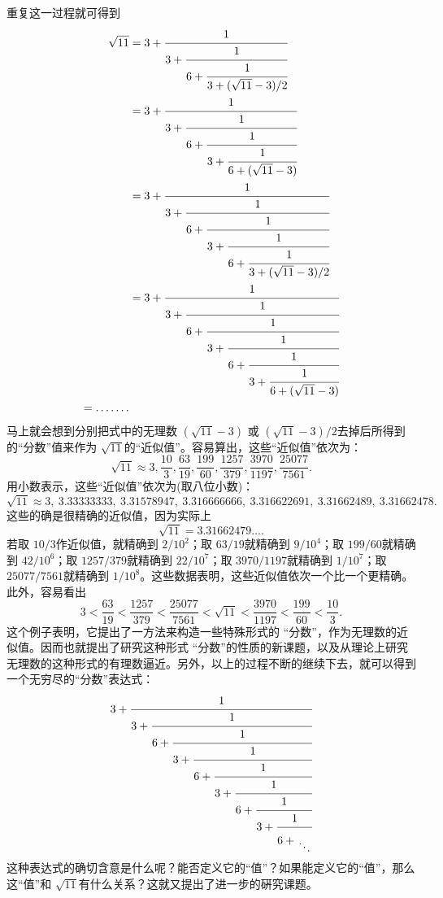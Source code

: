 \begin{example}
	重复这一过程就可得到
	\begin{align}
		\sqrt{11} & =
		3 + \cfrac{1}{3 +
			\cfrac{1}{6 +
				\cfrac{1}{3 +
					(\sqrt{11} -3)/2
		}}}          \label{cf5}  \\
		          & =
		3 + \cfrac{1}{3 +
			\cfrac{1}{6 +
				\cfrac{1}{3 +
					\cfrac{1}{6 +
						(\sqrt{11} -3)
		}}}}          \label{cf6} \\
		          & =
		3 + \cfrac{1}{3 +
			\cfrac{1}{6 +
				\cfrac{1}{3 +
					\cfrac{1}{6 +
						\cfrac{1}{3 +
							(\sqrt{11} -3) / 2
		}}}}}        \label{cf7}  \\
		          & =
		3 + \cfrac{1}{3 +
			\cfrac{1}{6 +
				\cfrac{1}{3 +
					\cfrac{1}{6 +
						\cfrac{1}{3 +
							\cfrac{1}{6 +
								(\sqrt{11} -3)
		}}}}}}        \label{cf8} \\
		= \dots\dots. \nonumber
	\end{align}
	马上就会想到分别把式中的无理数 \( (\sqrt{11} - 3) \) 或 \( (\sqrt{11} - 3)/2
	\)去掉后所得到的\enquote{分数}值来作为 \( \sqrt{11} \)的\enquote{近似值}。容易算出，这些\enquote{近似值}依次为：
	\begin{equation}\label{eq:根号11}
		\sqrt{11} \approx 3, \frac{10}{3}, \frac{63}{19}, \frac{199}{60}, \frac{1257}{379}, \frac{3970}{1197},
		\frac{25077}{7561}.
	\end{equation}
	用小数表示，这些\enquote{近似值}依次为(取八位小数)：
	\begin{equation}
		\sqrt{11} \approx 3,\: 3.33333333,\:3.31578947,\:3.316666666,\: 3.316622691,\: 3.31662489,\: 3.31662478.
	\end{equation}
	这些的确是很精确的近似值，因为实际上
	\begin{equation}
		\sqrt{11} = 3.31662479\dots.
	\end{equation}
	若取 \( 10 / 3 \)作近似值，就精确到 \( 2 / 10^2 \)；取 \( 63 / 19 \)就精确到 \( 9 / 10^4 \)；取 \( 199 / 60 \)就精确到
	\( 42 / 10^6 \)；取 \( 1257 / 379 \)就精确到 \( 22 / 10^7 \)；取 \( 3970 / 1197 \)就精确到 \( 1 / 10^7 \)；取 \( 25077 /
	7561\)就精确到 \( 1/10^8 \)。这些数据表明，这些近似值依次一个比一个更精确。此外，容易看出
	\begin{equation}
		3 < \frac{63}{19} < \frac{1257}{379} < \frac{25077}{7561} < \sqrt{11} < \frac{3970}{1197} < \frac{199}{60} <
		\frac{10}{3}.
	\end{equation}
	这个例子表明，它提出了一方法来构造一些特殊形式的 \enquote{分数}，作为无理数的近似值。因而也就提出了研究这种形式
	\enquote{分数}的性质的新课题，以及从理论上研究无理数的这种形式的有理数逼近。另外，以上的过程不断的继续下去，就可以得到
	一个无穷尽的\enquote{分数}表达式：
	\begin{equation}
		3 + \cfrac{1}{3 +
			\cfrac{1}{6 +
				\cfrac{1}{3 +
					\cfrac{1}{6 +
						\cfrac{1}{3 +
							\cfrac{1}{6 +
								\cfrac{1}{3 +
									\cfrac{1}{6 +
										\genfrac{}{}{0pt}{}{\phantom{1}}{\ddots}
									}}}}}}}}
	\end{equation}
	这种表达式的确切含意是什么呢？能否定义它的\enquote{值}？如果能定义它的\enquote{值}，那么这\enquote{值}和 \( \sqrt{11}
	\)有什么关系？这就又提出了进一步的硏究课题。
\end{example}

